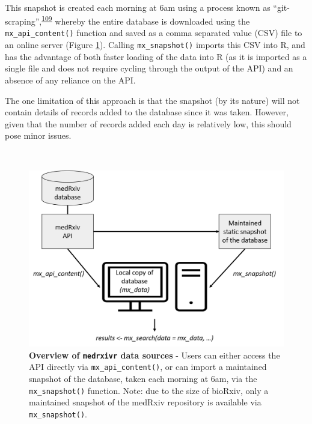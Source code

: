 \documentclass[a4paper, twoside]{templates/ociamthesis}
\begin{document}
~

This snapshot is created each morning at 6am using a process known as ``git-scraping'',\textsuperscript{\protect\hyperlink{ref-zotero-15031}{109}} whereby the entire database is downloaded using the \texttt{mx\_api\_content()} function and saved as a comma separated value (CSV) file to an online server (Figure \ref{fig:medrxivr-data-sources}). Calling \texttt{mx\_snapshot()} imports this CSV into R, and has the advantage of both faster loading of the data into R (as it is imported as a single file and does not require cycling through the output of the API) and an absence of any reliance on the API.

The one limitation of this approach is that the snapshot (by its nature) will not contain details of records added to the database since it was taken. However, given that the number of records added each day is relatively low, this should pose minor issues.

~





\begin{figure}[H]
\includegraphics[width=1\linewidth]{figures/sys-rev-tools/data_sources} \caption[Overview of \texttt{medrxivr} data sources]{\textbf{Overview of \texttt{medrxivr} data sources} - Users can either access the API directly via \texttt{mx\_api\_content()}, or can import a maintained snapshot of the database, taken each morning at 6am, via the \texttt{mx\_snapshot()} function. Note: due to the size of bioRxiv, only a maintained snapshot of the medRxiv repository is available via \texttt{mx\_snapshot()}.}\label{fig:medrxivr-data-sources}
\end{figure}
\end{document}
